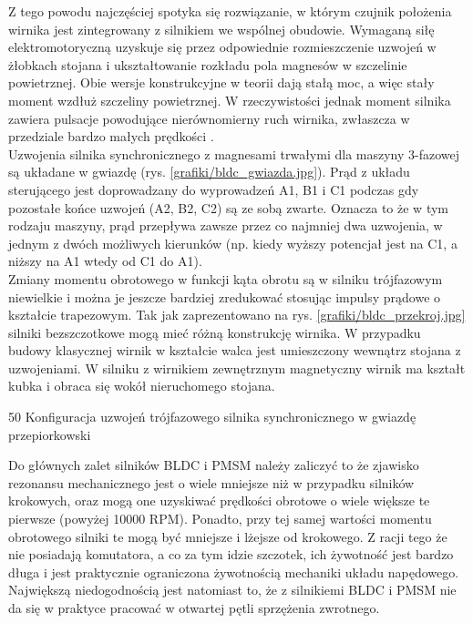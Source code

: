 Z tego powodu najczęściej spotyka się rozwiązanie, w którym czujnik położenia wirnika jest zintegrowany z silnikiem we wspólnej obudowie. Wymaganą siłę elektromotoryczną uzyskuje się przez odpowiednie rozmieszczenie uzwojeń w żłobkach stojana i ukształtowanie rozkładu pola magnesów w szczelinie powietrznej. Obie wersje konstrukcyjne w teorii dają stałą moc, a więc stały moment wzdłuż szczeliny powietrznej. W rzeczywistości jednak moment silnika zawiera pulsacje powodujące nierównomierny ruch wirnika, zwłaszcza w przedziale bardzo małych prędkości \cite{zawirski_pmsm}. \\
		
Uzwojenia silnika synchronicznego z magnesami trwałymi dla maszyny 3-fazowej są układane w gwiazdę (rys. \ref{grafiki/bldc_gwiazda.jpg}). Prąd z układu sterującego jest doprowadzany do wyprowadzeń A1, B1 i C1 podczas gdy pozostałe końce uzwojeń (A2, B2, C2) są ze sobą zwarte. Oznacza to że w tym rodzaju maszyny, prąd przepływa zawsze przez co najmniej dwa uzwojenia, w jednym z dwóch możliwych kierunków (np. kiedy wyższy potencjał jest na C1, a niższy na A1 wtedy od C1 do A1). \\
		
Zmiany momentu obrotowego w funkcji kąta obrotu są w silniku trójfazowym niewielkie i można je jeszcze bardziej zredukować stosując impulsy prądowe o kształcie trapezowym. 
Tak jak zaprezentowano na rys. \ref{grafiki/bldc_przekroj.jpg} silniki bezszczotkowe mogą mieć różną konstrukcję wirnika. W przypadku budowy klasycznej wirnik w kształcie walca jest umieszczony wewnątrz stojana z uzwojeniami. W silniku z wirnikiem zewnętrznym magnetyczny wirnik ma kształt kubka i obraca się wokół nieruchomego stojana. 

		{50}
		{Konfiguracja uzwojeń trójfazowego silnika synchronicznego w gwiazdę}
		{przepiorkowski}

Do głównych zalet silników BLDC i PMSM należy zaliczyć to że zjawisko rezonansu mechanicznego jest o wiele mniejsze niż w przypadku silników krokowych, oraz mogą one uzyskiwać prędkości obrotowe o wiele większe te pierwsze (powyżej 10000 RPM). Ponadto, przy tej samej wartości momentu obrotowego silniki te mogą być mniejsze i lżejsze od krokowego. Z racji tego że nie posiadają komutatora, a co za tym idzie szczotek, ich żywotność jest bardzo długa i jest praktycznie ograniczona żywotnością mechaniki układu napędowego. Największą niedogodnością jest natomiast to, że z silnikiemi BLDC i PMSM nie da się w praktyce pracować w otwartej pętli sprzężenia zwrotnego.



\clearpage

